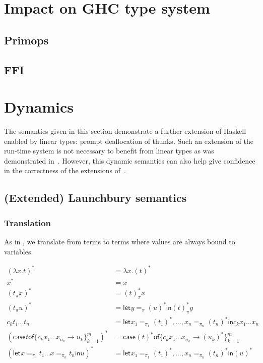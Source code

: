 \documentclass[11pt]{article}
\newcommand{\case}[3][]{\mathsf{case}_{#1} #2 \mathsf{of} \{#3\}^m_{k=1}}
\newcommand{\flet}[1][]{\mathsf{let}_{#1} }
\newcommand{\fin}{ \mathsf{in} }
\begin{document}
\section{Impact on GHC type system}
\label{sec:ghc}

\subsection{Primops}
\subsection{FFI}


\section{Dynamics}
\label{sec:orgheadline16}

The semantics given in this section demonstrate a further extension of
Haskell enabled by linear types: prompt deallocation of thunks. Such
an extension of the run-time system is not necessary to benefit from
linear types as was demonstrated in~\label{sec:ghc}. However, this
dynamic semantics can also help give confidence in the correctness of
the extensions of~\label{sec:ghc}.

\subsection{(Extended) Launchbury semantics}
\label{sec:orgheadline11}

\subsubsection{Translation}
\label{sec:orgheadline9}
As in \textcite{launchbury_natural_1993}, we translate from terms to
terms where values are always bound to variables. 


\begin{align*}
(λx. t)^* &= λx. (t)^* \\
x^*       &= x \\
  (t_π  x )^* &= (t)^*_π  x \\
  (t_π  u )^* &= \flet y =_{π} (u)^* \fin (t)^*_π  y \\
c_k  t₁ … t_n &= \flet x₁ =_{π_1} (t₁)^*,…, x_n =_{π_n} (t_n)^* \fin c_k x₁ … x_n \\
(\case t {c_k  x₁ … x_{n_k} → u_k})^* &= \case {(t)^*} {c_k  x₁ … x_{n_k} → (u_k)^*} \\
(\flet x =_{π₁} t₁  …  x =_{π_n} t_n \fin u)^* & = \flet x₁ =_{π_1} (t₁)^*,…, x_n =_{π_n} (t_n)^* \fin (u)^*
\end{align*}
\end{document}
